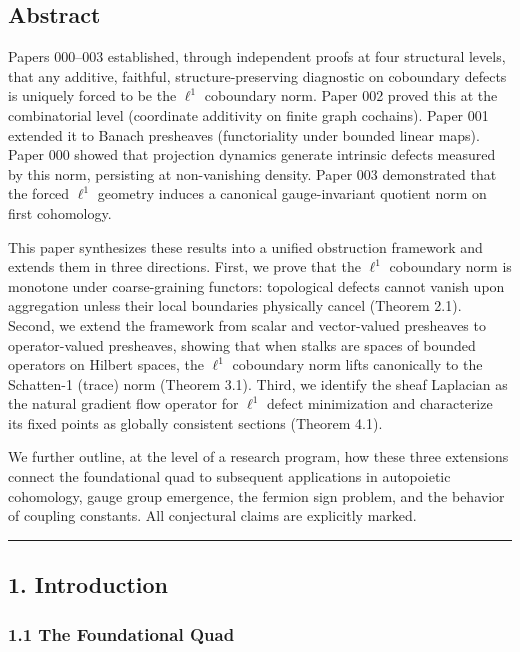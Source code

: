 \documentclass[
]{article}
\begin{document}
\subsection{Abstract}\label{abstract}

Papers 000--003 established, through independent proofs at four
structural levels, that any additive, faithful, structure-preserving
diagnostic on coboundary defects is uniquely forced to be the \(\ell^1\)
coboundary norm. Paper 002 proved this at the combinatorial level
(coordinate additivity on finite graph cochains). Paper 001 extended it
to Banach presheaves (functoriality under bounded linear maps). Paper
000 showed that projection dynamics generate intrinsic defects measured
by this norm, persisting at non-vanishing density. Paper 003
demonstrated that the forced \(\ell^1\) geometry induces a canonical
gauge-invariant quotient norm on first cohomology.

This paper synthesizes these results into a unified obstruction
framework and extends them in three directions. First, we prove that the
\(\ell^1\) coboundary norm is monotone under coarse-graining functors:
topological defects cannot vanish upon aggregation unless their local
boundaries physically cancel (Theorem 2.1). Second, we extend the
framework from scalar and vector-valued presheaves to operator-valued
presheaves, showing that when stalks are spaces of bounded operators on
Hilbert spaces, the \(\ell^1\) coboundary norm lifts canonically to the
Schatten-1 (trace) norm (Theorem 3.1). Third, we identify the sheaf
Laplacian as the natural gradient flow operator for \(\ell^1\) defect
minimization and characterize its fixed points as globally consistent
sections (Theorem 4.1).

We further outline, at the level of a research program, how these three
extensions connect the foundational quad to subsequent applications in
autopoietic cohomology, gauge group emergence, the fermion sign problem,
and the behavior of coupling constants. All conjectural claims are
explicitly marked.

\begin{center}\rule{0.5\linewidth}{0.5pt}\end{center}

\subsection{1. Introduction}\label{introduction}

\subsubsection{1.1 The Foundational Quad}\label{the-foundational-quad}
\end{document}
